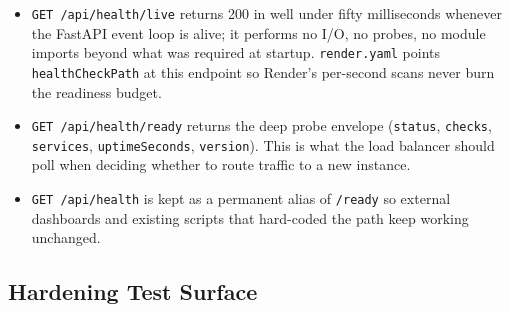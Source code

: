 \begin{itemize}
\item
  \texttt{GET /api/health/live} returns 200 in well under fifty milliseconds whenever the FastAPI event loop is alive; it performs no I/O, no probes, no module imports beyond what was required at startup. \texttt{render.yaml} points \texttt{healthCheckPath} at this endpoint so Render's per-second scans never burn the readiness budget.
\item
  \texttt{GET /api/health/ready} returns the deep probe envelope (\texttt{status}, \texttt{checks}, \texttt{services}, \texttt{uptimeSeconds}, \texttt{version}). This is what the load balancer should poll when deciding whether to route traffic to a new instance.
\item
  \texttt{GET /api/health} is kept as a permanent alias of \texttt{/ready} so external dashboards and existing scripts that hard-coded the path keep working unchanged.
\end{itemize}

 \subsection{Hardening Test Surface}

